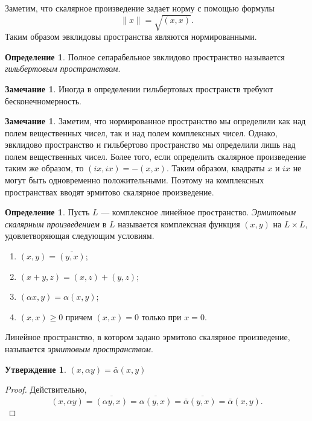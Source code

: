\documentclass[12pt, titlepage, oneside]{amsbook}
\newtheorem{claim}[theorem]{Утверждение}
\theoremstyle{definition}
\newtheorem{definition}[theorem]{Определение}
\newtheorem{remark}[theorem]{Замечание}
\theoremstyle{remark}
\begin{document}
Заметим, что скалярное произведение задает норму с помощью формулы $$\|x\|=\sqrt{(x,x)}.$$ Таким образом эвклидовы пространства являются нормированными.

\begin{definition}
Полное сепарабельное эвклидово пространство называется \emph{гильбертовым пространством}.
\end{definition}

\begin{remark}
Иногда в определении гильбертовых пространств требуют бесконечномерность.
\end{remark}

\begin{remark}
Заметим, что нормированное пространство мы определили как над полем вещественных чисел, так и над полем комплексных чисел. Однако, эвклидово пространство и гильбертово пространство мы определили лишь над полем вещественных чисел. Более того, если определить скалярное произведение таким же образом, то $(ix,ix)=-(x,x)$. Таким образом, квадраты $x$ и $ix$ не могут быть одновременно положительными. Поэтому на комплексных пространствах вводят эрмитово скалярное произведение.
\end{remark}

\begin{definition}
Пусть $L$ --- комплексное линейное пространство. \emph{Эрмитовым скалярным произведением} в $L$ называется комплексная функция $(x,y)$ на $L\times L$, удовлетворяющая следующим условиям.
\begin{enumerate}
\item $(x,y)=\overline{(y,x)}$;
\item $(x+y,z)=(x,z)+(y,z)$;
\item $(\alpha x,y)=\alpha (x,y)$;
\item $(x,x)\geq 0$ причем $(x,x)=0$ только при $x=0$.
\end{enumerate}
Линейное пространство, в котором задано эрмитово скалярное произведение, называется \emph{эрмитовым пространством}.
\end{definition}

\begin{claim}
\label{Er1} $(x,\alpha y)=\bar{\alpha}(x,y)$
\end{claim}

\begin{proof}
Действительно, $$(x,\alpha y)=\overline{(\alpha y,x)}=\overline{\alpha(y,x)}=\bar{\alpha}\overline{(y,x)}=\bar{\alpha}(x,y).$$
\end{proof}
\end{document}
